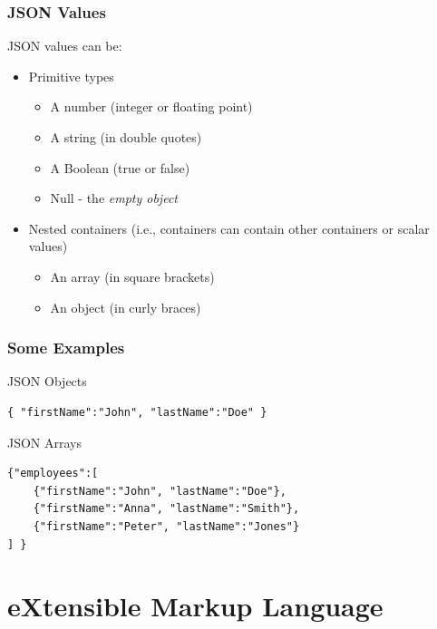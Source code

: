 \documentclass[svgnames]{beamer}
\begin{document}
\begin{frame}
\frametitle{JSON Values}

JSON values can be:
\begin{itemize}
  \item Primitive types
    \begin{itemize}
    \item A number (integer or floating point)
    \item A string (in double quotes)
    \item A Boolean (true or false)
    \item Null - the {\it empty object}
    \end{itemize}
  \item Nested containers (i.e., containers can contain other containers or scalar values)
  \begin{itemize}
    \item An array (in square brackets)
    \item An object (in curly braces)
  \end{itemize}
\end{itemize}
\end{frame}

\begin{frame}[fragile]
\frametitle{Some Examples}
\begin{block}{JSON Objects}
\begin{verbatim}
{ "firstName":"John", "lastName":"Doe" }
\end{verbatim}
\end{block}

\bigskip

\begin{block}{JSON Arrays}
\begin{verbatim}
{"employees":[
    {"firstName":"John", "lastName":"Doe"},
    {"firstName":"Anna", "lastName":"Smith"},
    {"firstName":"Peter", "lastName":"Jones"}
] }
\end{verbatim}
\end{block}

\end{frame}


\section{eXtensible Markup Language}

\end{document}
